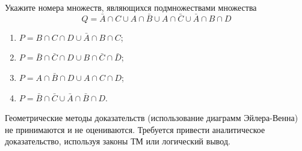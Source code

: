 \question
Укажите номера множеств, являющихся подмножествами множества
\begin{equation*}
	Q = \bar{A} \cap C \cup A \cap \bar{B} \cup A \cap \bar{C} \cup \bar{A} \cap B \cap D
\end{equation*}

\begin{enumerate}
	\renewcommand{\labelenumi}{\arabic{enumi})}
	\item $P = B \cap C \cap D \cup \bar{A} \cap B \cap C$;
	\item $P = \bar{B} \cap \bar{C} \cap D \cup B \cap \bar{C} \cap \bar{D}$;
	\item $P = A \cap \bar{B} \cap D \cup A \cap C \cap D$;
	\item $P = \bar{B} \cap \bar{C} \cup \bar{A} \cap \bar{B} \cap D$.
\end{enumerate}

Геометрические методы доказательств (использование диаграмм Эйлера-Венна) не принимаются и не оцениваются. Требуется привести аналитическое доказательство, используя законы ТМ или логический вывод.
